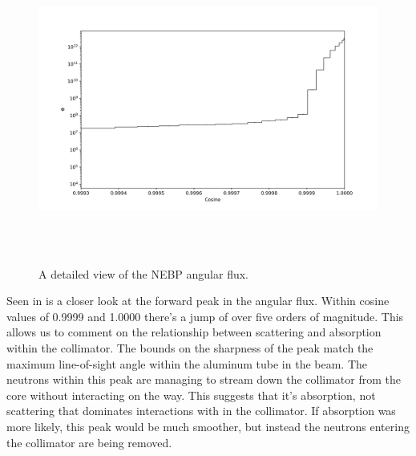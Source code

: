 %
\begin{figure}[htb]
\centering
\includegraphics[height=4in]{tex/figures/flux_cos_detail.png}
\caption[Detailed Flux vs. Angle]{A detailed view of the NEBP angular flux.}
\label{fig:flux_cos_detail}
\end{figure}

Seen in  is a closer look at the forward peak in the angular flux.
Within cosine values of 0.9999 and 1.0000 there's a jump of over five orders of magnitude.
This allows us to comment on the relationship between scattering and absorption within the collimator.
The bounds on the sharpness of the peak match the maximum line-of-sight angle within the aluminum tube in the beam.
The neutrons within this peak are managing to stream down the collimator from the core without interacting on the way.
This suggests that it's absorption, not scattering that dominates interactions with in the collimator.
If absorption was more likely, this peak would be much smoother, but instead the neutrons entering the collimator are being removed.

